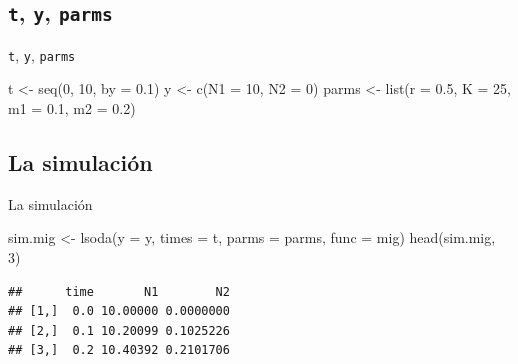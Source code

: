 \documentclass[
  11pt,
  ignorenonframetext,
]{beamer}
\newenvironment{Shaded}{}{}
\newcommand{\AttributeTok}[1]{\textcolor[rgb]{0.49,0.56,0.16}{#1}}
\newcommand{\DecValTok}[1]{\textcolor[rgb]{0.25,0.63,0.44}{#1}}
\newcommand{\FloatTok}[1]{\textcolor[rgb]{0.25,0.63,0.44}{#1}}
\newcommand{\FunctionTok}[1]{\textcolor[rgb]{0.02,0.16,0.49}{#1}}
\newcommand{\NormalTok}[1]{#1}
\newcommand{\OtherTok}[1]{\textcolor[rgb]{0.00,0.44,0.13}{#1}}
\begin{document}
\hypertarget{t-y-parms-1}{%
\subsection{\texorpdfstring{\texttt{t}, \texttt{y},
\texttt{parms}}{t, y, parms}}\label{t-y-parms-1}}

\begin{frame}[fragile]{\texttt{t}, \texttt{y}, \texttt{parms}}
\begin{Shaded}
\begin{Highlighting}[]
\NormalTok{t }\OtherTok{\textless{}{-}} \FunctionTok{seq}\NormalTok{(}\DecValTok{0}\NormalTok{, }\DecValTok{10}\NormalTok{, }\AttributeTok{by =} \FloatTok{0.1}\NormalTok{)}
\NormalTok{y }\OtherTok{\textless{}{-}} \FunctionTok{c}\NormalTok{(}\AttributeTok{N1 =} \DecValTok{10}\NormalTok{, }\AttributeTok{N2 =} \DecValTok{0}\NormalTok{)}
\NormalTok{parms }\OtherTok{\textless{}{-}} \FunctionTok{list}\NormalTok{(}\AttributeTok{r =} \FloatTok{0.5}\NormalTok{, }\AttributeTok{K =} \DecValTok{25}\NormalTok{,}
              \AttributeTok{m1 =} \FloatTok{0.1}\NormalTok{, }\AttributeTok{m2 =} \FloatTok{0.2}\NormalTok{)}
\end{Highlighting}
\end{Shaded}
\end{frame}

\hypertarget{la-simulaciuxf3n}{%
\subsection{La simulación}\label{la-simulaciuxf3n}}

\begin{frame}[fragile]{La simulación}
\begin{Shaded}
\begin{Highlighting}[]
\NormalTok{sim.mig }\OtherTok{\textless{}{-}} \FunctionTok{lsoda}\NormalTok{(}\AttributeTok{y =}\NormalTok{ y, }\AttributeTok{times =}\NormalTok{ t, }
                 \AttributeTok{parms =}\NormalTok{ parms,}
                 \AttributeTok{func =}\NormalTok{ mig)}
\FunctionTok{head}\NormalTok{(sim.mig, }\DecValTok{3}\NormalTok{)}
\end{Highlighting}
\end{Shaded}

\begin{verbatim}
##      time       N1        N2
## [1,]  0.0 10.00000 0.0000000
## [2,]  0.1 10.20099 0.1025226
## [3,]  0.2 10.40392 0.2101706
\end{verbatim}
\end{frame}
\end{document}
